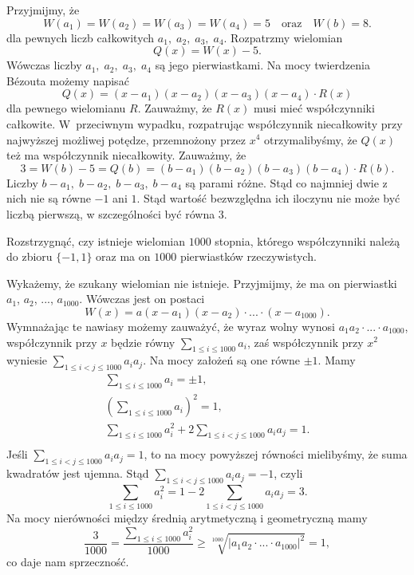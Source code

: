 \noindent
Przyjmijmy, że
\[
    W(a_1) = W(a_2) = W(a_3) = W(a_4) = 5 \quad \text{oraz} \quad W(b) = 8.
\]
dla pewnych liczb całkowitych $a_1, \; a_2, \; a_3, \; a_4$.
Rozpatrzmy wielomian
\[
    Q(x) = W(x) - 5.
\]
Wówczas liczby $a_1, \; a_2, \; a_3, \; a_4$ są jego pierwiastkami. Na mocy twierdzenia Bézouta możemy napisać
\[
    Q(x) = (x - a_1)(x - a_2)(x - a_3)(x - a_4) \cdot R(x)
\]
dla pewnego wielomianu $R$. Zauważmy, że $R(x)$ musi mieć współczynniki całkowite. W~przeciwnym wypadku, rozpatrując współczynnik niecałkowity przy najwyższej możliwej potędze, przemnożony przez $x^4$ otrzymalibyśmy, że $Q(x)$ też ma współczynnik niecałkowity.
Zauważmy, że
\[
    3 = W(b) - 5 = Q(b) = (b - a_1)(b - a_2)(b - a_3)(b - a_4) \cdot R(b).
\]
Liczby $b - a_1, \; b - a_2, \;b - a_3, \;b - a_4$ są parami różne. Stąd co najmniej dwie z nich nie są równe $-1$ ani $1$. Stąd wartość bezwzględna ich iloczynu nie może być liczbą pierwszą, w szczególności być równa $3$.



\begin{problem}{6}
    Rozstrzygnąć, czy istnieje wielomian $1000$ stopnia, którego współczynniki należą do zbioru $\{-1, 1\}$ oraz ma on $1000$ pierwiastków rzeczywistych.
\end{problem}

\noindent
Wykażemy, że szukany wielomian nie istnieje. Przyjmijmy, że ma on pierwiastki $a_1$, $a_2$, ..., $a_{1000}$. Wówczas jest on postaci
\[
    W(x) = a(x - a_1)(x - a_2)\cdot ... \cdot (x - a_{1000}).
\]
Wymnażając te nawiasy możemy zauważyć, że wyraz wolny wynosi $a_1a_2 \cdot ... \cdot a_{1000}$, współczynnik przy $x$ będzie równy $\sum_{1 \leqslant i \leqslant 1000} a_i$, zaś współczynnik przy $x^2$ wyniesie $\sum_{1 \leqslant i < j \leqslant 1000} a_ia_j$. Na mocy założeń są one równe $\pm 1$. Mamy
\begin{align*}
    \sum_{1 \leqslant i \leqslant 1000} a_i = \pm 1, \\
    \left(\sum_{1 \leqslant i \leqslant 1000} a_i\right)^2 = 1, \\
   \sum_{1 \leqslant i \leqslant 1000} a_i^2 + 2\sum_{1 \leqslant i < j \leqslant 1000} a_ia_j = 1. \\
\end{align*}
Jeśli $\sum_{1 \leqslant i < j \leqslant 1000} a_ia_j = 1$, to na mocy powyższej równości mielibyśmy, że suma kwadratów jest ujemna. Stąd $\sum_{1 \leqslant i < j \leqslant 1000} a_ia_j = -1$, czyli
\[
    \sum_{1 \leqslant i \leqslant 1000} a_i^2 = 1 - 2\sum_{1 \leqslant i < j \leqslant 1000} a_ia_j = 3.
\]
Na mocy nierówności między średnią arytmetyczną i geometryczną mamy
\[
   \frac{3}{1000} =  \frac{\sum_{1 \leqslant i \leqslant 1000} a_i^2}{1000} \geqslant \sqrt[1000]{|a_1a_2\cdot ... \cdot a_{1000}|^2} = 1,
\]
co daje nam sprzeczność.

